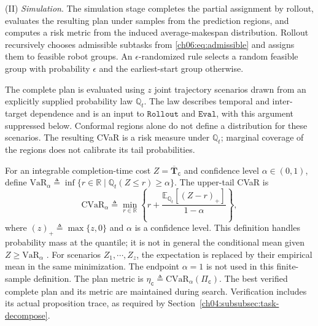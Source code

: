 (II) \emph{Simulation}.
The simulation stage completes the partial assignment by rollout, evaluates the
resulting plan under samples from the prediction regions, and computes a risk
metric from the induced average-makespan distribution. Rollout recursively
chooses admissible subtasks from \eqref{ch06:eq:admissible} and assigns them to
feasible robot groups. An $\epsilon$-randomized rule selects a random feasible
group with probability $\epsilon$ and the earliest-start group otherwise. \begin{revision}
The complete plan is evaluated using $z$ joint trajectory scenarios drawn
from an explicitly supplied probability law $\mathbb Q_t$.
The law describes temporal and inter-target dependence and is an input to
$\texttt{Rollout}$ and $\texttt{Eval}$, with this argument suppressed below.
Conformal regions alone do not define a distribution for these scenarios.
The resulting CVaR is a risk measure under $\mathbb Q_t$; marginal coverage
of the regions does not calibrate its tail probabilities.

For an integrable completion-time cost $Z=\mathbf{\overline T}_{\texttt c}$
and confidence level $\alpha\in(0,1)$, define
$\mathrm{VaR}_\alpha\triangleq
\inf\{r\in\mathbb R\mid\mathbb Q_t(Z\le r)\ge\alpha\}$.
The upper-tail CVaR is
\[
\mathrm{CVaR}_\alpha\triangleq
\min_{r\in\mathbb R}
\left\{r+\frac{\mathbb E_{\mathbb Q_t}[(Z-r)_+]}{1-\alpha}\right\},
\]
where $(z)_+\triangleq\max\{z,0\}$ and $\alpha$ is a confidence level.
This definition handles probability mass at the quantile; it is not in
general the conditional mean given $Z\ge\mathrm{VaR}_\alpha$
\citep{rockafellar2002cvar}.
For scenarios $Z_1,\cdots,Z_z$, the expectation is replaced by their
empirical mean in the same minimization. The endpoint $\alpha=1$ is not
used in this finite-sample definition.
The plan metric is $\eta_{\texttt c}\triangleq
\mathrm{CVaR}_\alpha(\Pi_{\texttt c})$.
The best verified complete plan and its metric are maintained during search.
Verification includes its actual proposition trace, as required by
Section~\ref{ch04:subsubsec:task-decompose}.
\end{revision}

